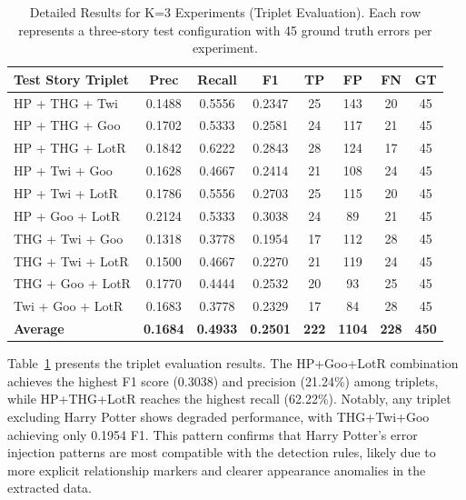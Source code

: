 \begin{table}[htbp]
\centering
\caption{Detailed Results for K=3 Experiments (Triplet Evaluation). Each row represents a three-story test configuration with 45 ground truth errors per experiment.}
\label{tab:k3_detailed}
\begin{tabular}{lccccccc}
\toprule
\textbf{Test Story Triplet} & \textbf{Prec} & \textbf{Recall} & \textbf{F1} & \textbf{TP} & \textbf{FP} & \textbf{FN} & \textbf{GT} \\
\midrule
HP + THG + Twi & 0.1488 & 0.5556 & 0.2347 & 25 & 143 & 20 & 45 \\
HP + THG + Goo & 0.1702 & 0.5333 & 0.2581 & 24 & 117 & 21 & 45 \\
HP + THG + LotR & 0.1842 & 0.6222 & 0.2843 & 28 & 124 & 17 & 45 \\
HP + Twi + Goo & 0.1628 & 0.4667 & 0.2414 & 21 & 108 & 24 & 45 \\
HP + Twi + LotR & 0.1786 & 0.5556 & 0.2703 & 25 & 115 & 20 & 45 \\
HP + Goo + LotR & 0.2124 & 0.5333 & 0.3038 & 24 & 89 & 21 & 45 \\
THG + Twi + Goo & 0.1318 & 0.3778 & 0.1954 & 17 & 112 & 28 & 45 \\
THG + Twi + LotR & 0.1500 & 0.4667 & 0.2270 & 21 & 119 & 24 & 45 \\
THG + Goo + LotR & 0.1770 & 0.4444 & 0.2532 & 20 & 93 & 25 & 45 \\
Twi + Goo + LotR & 0.1683 & 0.3778 & 0.2329 & 17 & 84 & 28 & 45 \\
\midrule
\textbf{Average} & \textbf{0.1684} & \textbf{0.4933} & \textbf{0.2501} & \textbf{222} & \textbf{1104} & \textbf{228} & \textbf{450} \\
\bottomrule
\end{tabular}
\end{table}

Table~\ref{tab:k3_detailed} presents the triplet evaluation results. The HP+Goo+LotR combination achieves the highest F1 score (0.3038) and precision (21.24\%) among triplets, while HP+THG+LotR reaches the highest recall (62.22\%). Notably, any triplet excluding Harry Potter shows degraded performance, with THG+Twi+Goo achieving only 0.1954 F1. This pattern confirms that Harry Potter's error injection patterns are most compatible with the detection rules, likely due to more explicit relationship markers and clearer appearance anomalies in the extracted data.


